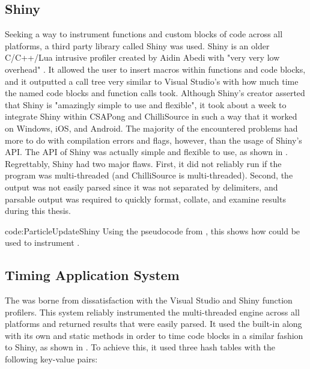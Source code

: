 \subsection{Shiny}\label{ssec:instr_timing_system_shiny}

Seeking a way to instrument functions and custom blocks of code across all platforms, a third party library called Shiny was used. Shiny is an older C/C++/Lua intrusive profiler created by Aidin Abedi with "very very low overhead" \cite{AbediShinyProfiler}. It allowed the user to insert macros within functions and code blocks, and it outputted a call tree very similar to Visual Studio's with how much time the named code blocks and function calls took. Although Shiny's creator asserted that Shiny is "amazingly simple to use and flexible", it took about a week to integrate Shiny within CSAPong and ChilliSource in such a way that it worked on Windows, iOS, and Android. The majority of the encountered problems had more to do with compilation errors and flags, however, than the usage of Shiny's API. The API of Shiny was actually simple and flexible to use, as shown in . Regrettably, Shiny had two major flaws. First, it did not reliably run if the program was multi-threaded (and ChilliSource is multi-threaded). Second, the output was not easily parsed since it was not separated by delimiters, and parsable output was required to quickly format, collate, and examine results during this thesis.

{code:ParticleUpdateShiny}
{Using the pseudocode from , this shows how  could be used to instrument . }

\vspace{-0.5cm}
\subsection{Timing Application System}\label{ssec:instr_timing_system_custom}

The  was borne from dissatisfaction with the Visual Studio and Shiny function profilers. This system reliably instrumented the multi-threaded engine across all platforms and returned results that were easily parsed. It used the built-in  along with its own  and  static methods in order to time code blocks in a similar fashion to Shiny, as shown in . To achieve this, it used three hash tables\footnotemark $ $ with the following key-value pairs:

